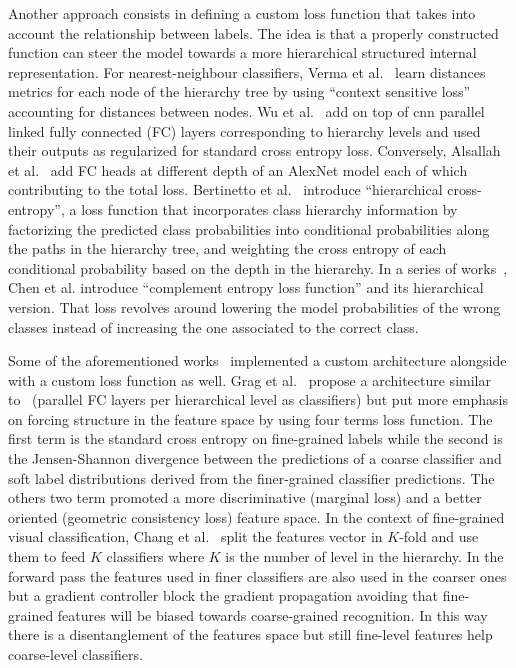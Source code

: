 Another approach consists in defining a custom loss function that takes into
account the relationship between labels. The idea is that a properly
constructed function can steer the model towards a more hierarchical structured
internal representation. For nearest-neighbour classifiers, Verma et
al.~\cite{LearningHierarVerma2012} learn distances metrics for each node of the
hierarchy tree by using ``context sensitive loss'' accounting for distances
between nodes. Wu et al.~\cite{LearningToMakWuHu2016} add on top of
\acrshort{cnn} parallel linked fully connected (FC) layers corresponding to
hierarchy levels and used their outputs as regularized for standard cross
entropy loss. Conversely, Alsallah et al.~\cite{DoConvolutionaAlsall2017} add
FC heads at different depth of an AlexNet model each of which contributing to
the total loss. Bertinetto et al.~\cite{MakingBetterMBertin2019} introduce
``hierarchical cross-entropy'', a loss function that incorporates class
hierarchy information by factorizing the predicted class probabilities into
conditional probabilities along the paths in the hierarchy tree, and weighting
the cross entropy of each conditional probability based on the depth in the
hierarchy. In a series of works~\cite{ComplementObjeChen2019,
ImprovingAdverChen2019, LearningWithHChen2019}, Chen et al. introduce
``complement entropy loss function'' and its hierarchical version. That loss
revolves around lowering the model probabilities of the wrong classes instead
of increasing the one associated to the correct class.

Some of the aforementioned works~\cite{LearningToMakWuHu2016,
DoConvolutionaAlsall2017} implemented a custom architecture alongside with a
custom loss function as well. Grag et al.~\cite{LearningHierarGarg2022} propose
a architecture similar to~\cite{LearningToMakWuHu2016} (parallel FC layers per
hierarchical level as classifiers) but put more emphasis on forcing structure
in the feature space by using four terms loss function. The first term is the
standard cross entropy on fine-grained labels while the second is the
Jensen-Shannon divergence between the predictions of a coarse classifier and
soft label distributions derived from the finer-grained classifier predictions.
The others two term promoted a more discriminative (marginal loss) and a better
oriented (geometric consistency loss) feature space. In the context of
fine-grained visual classification, Chang et al.~\cite{YourFlamingoChang2020}
split the features vector in $K$-fold and use them to feed $K$ classifiers
where $K$ is the number of level in the hierarchy. In the forward pass the
features used in finer classifiers are also used in the coarser ones but a
gradient controller block the gradient propagation avoiding that fine-grained
features will be biased towards coarse-grained recognition. In this way there
is a disentanglement of the features space but still fine-level features help
coarse-level classifiers.

